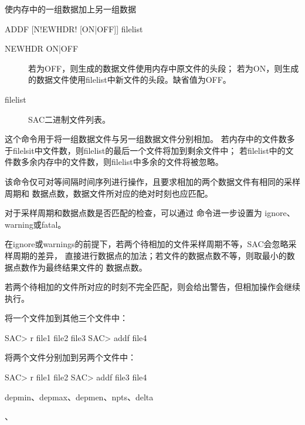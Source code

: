 \label{cmd:addf}

使内存中的一组数据加上另一组数据

\begin{SACSTX}
ADDF [N!EWHDR! [ON|OFF]] filelist
\end{SACSTX}

\begin{description}
\item [NEWHDR ON|OFF] 若为OFF，则生成的数据文件使用内存中原文件的头段；
    若为ON，则生成的数据文件使用filelist中新文件的头段。缺省值为OFF。
\item [filelist] SAC二进制文件列表。
\end{description}

这个命令用于将一组数据文件与另一组数据文件分别相加。
若内存中的文件数多于filelsit中文件数，则filelist的最后一个文件将加到剩余文件中；
若filelist中的文件数多余内存中的文件数，则filelist中多余的文件将被忽略。

该命令仅可对等间隔时间序列进行操作，且要求相加的两个数据文件有相同的采样周期和
数据点数，数据文件所对应的绝对时刻也应匹配。

对于采样周期和数据点数是否匹配的检查，可以通过  命令进一步设置为
ignore、warning或fatal。

在ignore或warnings的前提下，若两个待相加的文件采样周期不等，SAC会忽略采样周期的差异，
直接进行数据点的加法；若文件的数据点数不等，则取最小的数据点数作为最终结果文件的
数据点数。

若两个待相加的文件所对应的时刻不完全匹配，则会给出警告，但相加操作会继续执行。

将一个文件加到其他三个文件中：
\begin{SACCode}
SAC> r file1 file2 file3
SAC> addf file4
\end{SACCode}

将两个文件分别加到另两个文件中：
\begin{SACCode}
SAC> r file1 file2
SAC> addf file3 file4
\end{SACCode}

depmin、depmax、depmen、npts、delta

、
